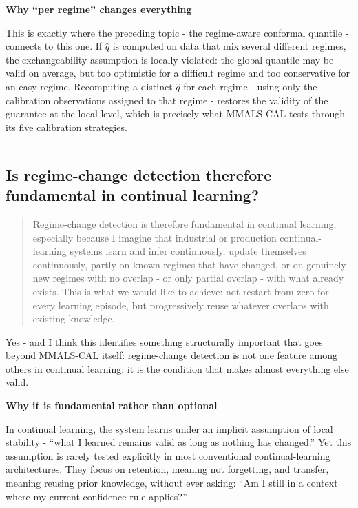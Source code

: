 \textbf{Why ``per regime'' changes everything}

This is exactly where the preceding topic - the regime-aware conformal quantile - connects to this one. If \(\hat q\) is computed on data that mix several different regimes, the exchangeability assumption is locally violated: the global quantile may be valid on average, but too optimistic for a difficult regime and too conservative for an easy regime. Recomputing a distinct \(\hat q\) for each regime - using only the calibration observations assigned to that regime - restores the validity of the guarantee at the local level, which is precisely what MMALS-CAL tests through its five calibration strategies.

\begin{center}\rule{0.5\linewidth}{0.5pt}\end{center}

\subsection{Is regime-change detection therefore fundamental in continual learning?}\label{is-regime-change-detection-therefore-fundamental-in-continual-learning}

\begin{quote}
Regime-change detection is therefore fundamental in continual learning, especially because I imagine that industrial or production continual-learning systems learn and infer continuously, update themselves continuously, partly on known regimes that have changed, or on genuinely new regimes with no overlap - or only partial overlap - with what already exists. This is what we would like to achieve: not restart from zero for every learning episode, but progressively reuse whatever overlaps with existing knowledge.
\end{quote}

Yes - and I think this identifies something structurally important that goes beyond MMALS-CAL itself: regime-change detection is not one feature among others in continual learning; it is the condition that makes almost everything else valid.

\textbf{Why it is fundamental rather than optional}

In continual learning, the system learns under an implicit assumption of local stability - ``what I learned remains valid as long as nothing has changed.'' Yet this assumption is rarely tested explicitly in most conventional continual-learning architectures. They focus on retention, meaning not forgetting, and transfer, meaning reusing prior knowledge, without ever asking: ``Am I still in a context where my current confidence rule applies?''

